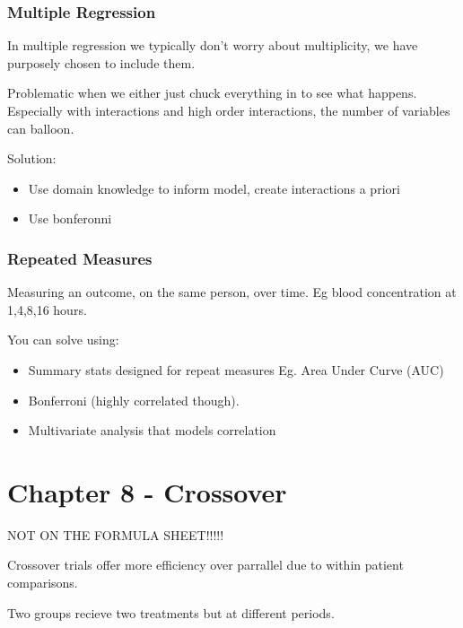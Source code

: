 \documentclass[
  letterpaper,
  DIV=11,
  numbers=noendperiod]{scrreprt}
\providecommand{\tightlist}{%
  \setlength{\itemsep}{0pt}\setlength{\parskip}{0pt}}\usepackage{longtable,booktabs,array}
\begin{document}
\hypertarget{multiple-regression}{%
\subsubsection{Multiple Regression}\label{multiple-regression}}

In multiple regression we typically don't worry about multiplicity, we
have purposely chosen to include them.

Problematic when we either just chuck everything in to see what happens.
Especially with interactions and high order interactions, the number of
variables can balloon.

Solution:

\begin{itemize}
\tightlist
\item
  Use domain knowledge to inform model, create interactions a priori
\item
  Use bonferonni
\end{itemize}

\hypertarget{repeated-measures}{%
\subsubsection{Repeated Measures}\label{repeated-measures}}

Measuring an outcome, on the same person, over time. Eg blood
concentration at 1,4,8,16 hours.

You can solve using:

\begin{itemize}
\tightlist
\item
  Summary stats designed for repeat measures Eg. Area Under Curve (AUC)
\item
  Bonferroni (highly correlated though).
\item
  Multivariate analysis that models correlation
\end{itemize}

\hypertarget{chapter-8---crossover}{%
\section{Chapter 8 - Crossover}\label{chapter-8---crossover}}

NOT ON THE FORMULA SHEET!!!!!

Crossover trials offer more efficiency over parrallel due to within
patient comparisons.

Two groups recieve two treatments but at different periods.
\end{document}
